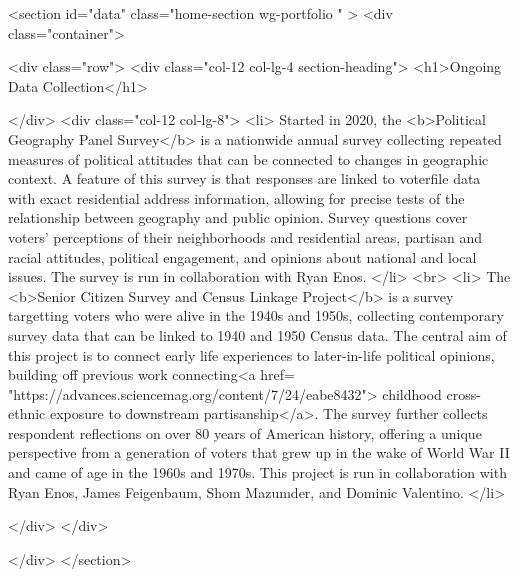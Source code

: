   <section id="data" class="home-section wg-portfolio   "  >
    <div class="container">



      <div class="row">
        <div class="col-12 col-lg-4 section-heading">
          <h1>Ongoing Data Collection</h1>

        </div>
        <div class="col-12 col-lg-8">
<li> Started in 2020, the <b>Political Geography Panel Survey</b> is a nationwide annual survey collecting repeated measures of political attitudes that can be connected to changes in geographic context. A feature of this survey is that responses are linked to voterfile data with exact residential address information, allowing for precise tests of the relationship between geography and public opinion. Survey questions cover voters' perceptions of their neighborhoods and residential areas, partisan and racial attitudes, political engagement, and opinions about national and local issues. The survey is run in collaboration with Ryan Enos. </li>
<br>
<li> The <b>Senior Citizen Survey and Census Linkage Project</b> is a survey targetting voters who were alive in the 1940s and 1950s, collecting contemporary survey data that can be linked to 1940 and 1950 Census data. The central aim of this project is to connect early life experiences to later-in-life political opinions, building off previous work connecting<a href= "https://advances.sciencemag.org/content/7/24/eabe8432"> childhood cross-ethnic exposure to downstream partisanship</a>. The survey further collects respondent reflections on over 80 years of American history, offering a unique perspective from a generation of voters that grew up in the wake of World War II and came of age in the 1960s and 1970s.  This project is run in collaboration with Ryan Enos, James Feigenbaum, Shom Mazumder, and Dominic Valentino.  </li>







        </div>
      </div>

          </div>
        </section>



























